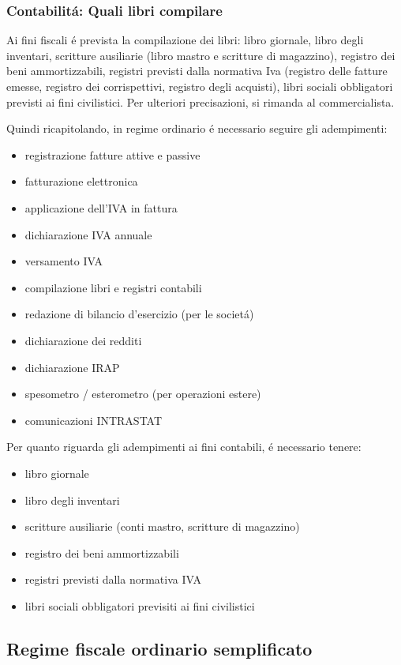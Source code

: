 \documentclass{article}
\begin{document}
\subsubsection{Contabilit\'a: Quali libri compilare}
Ai fini fiscali \'e prevista la compilazione dei libri: libro giornale, 
libro degli inventari, 
scritture ausiliarie (libro mastro e scritture di magazzino), 
registro dei beni ammortizzabili, 
registri previsti dalla normativa Iva (registro delle fatture emesse, registro dei corrispettivi, registro degli acquisti), 
libri sociali obbligatori previsti ai fini civilistici.
Per ulteriori precisazioni, si rimanda al commercialista.

Quindi ricapitolando, in regime ordinario \'e necessario seguire gli adempimenti:
\begin{itemize}
    \item registrazione fatture attive e passive
    \item fatturazione elettronica
    \item applicazione dell'IVA in fattura
    \item dichiarazione IVA annuale
    \item versamento IVA
    \item compilazione libri e registri contabili
    \item redazione di bilancio d'esercizio (per le societ\'a)
    \item dichiarazione dei redditi
    \item dichiarazione IRAP
    \item spesometro / esterometro (per operazioni estere)
    \item comunicazioni INTRASTAT
\end{itemize}

Per quanto riguarda gli adempimenti ai fini contabili, \'e necessario tenere:
\begin{itemize}
    \item libro giornale
    \item libro degli inventari
    \item scritture ausiliarie (conti mastro, scritture di magazzino)
    \item registro dei beni ammortizzabili
    \item registri previsti dalla normativa IVA
    \item libri sociali obbligatori previsiti ai fini civilistici
\end{itemize}

\subsection{Regime fiscale ordinario semplificato}
\end{document}
